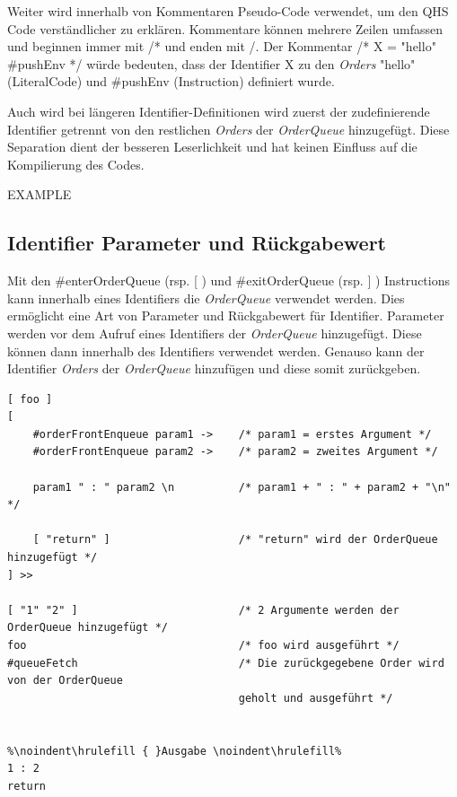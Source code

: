 Weiter wird innerhalb von Kommentaren Pseudo-Code verwendet, um den QHS Code verständlicher zu erklären.
Kommentare können mehrere Zeilen umfassen und beginnen immer mit {\listingFont\selectfont /*} und enden mit {\listingFont\selectfont*/}.
Der Kommentar {\listingFont\selectfont /* X = "hello" \#pushEnv */} würde bedeuten,
dass der Identifier {\listingFont\selectfont X} zu den \textit{Orders} {\listingFont\selectfont "hello" (LiteralCode)} und {\listingFont\selectfont \#pushEnv (Instruction)} definiert wurde. 

Auch wird bei längeren Identifier-Definitionen wird zuerst der zudefinierende Identifier getrennt von den restlichen \textit{Orders} der \textit{OrderQueue} hinzugefügt.
Diese Separation dient der besseren Leserlichkeit und hat keinen Einfluss auf die Kompilierung des Codes.

EXAMPLE

\subsection{Identifier Parameter und Rückgabewert}
Mit den \#enterOrderQueue (rsp. [ ) und \#exitOrderQueue (rsp. ] ) Instructions kann innerhalb eines Identifiers die \textit{OrderQueue} verwendet werden. Dies ermöglicht eine Art von Parameter und Rückgabewert für Identifier.
Parameter werden vor dem Aufruf eines Identifiers der \textit{OrderQueue} hinzugefügt. Diese können dann innerhalb des Identifiers verwendet werden.
Genauso kann der Identifier \textit{Orders} der \textit{OrderQueue} hinzufügen und diese somit zurückgeben.

\begin{lstlisting}[language=QHS, caption=Verwendung von Parametern und Rückgabewert eines Identifiers]
[ foo ]
[
    #orderFrontEnqueue param1 ->    /* param1 = erstes Argument */
    #orderFrontEnqueue param2 ->    /* param2 = zweites Argument */

    param1 " : " param2 \n          /* param1 + " : " + param2 + "\n" */

    [ "return" ]                    /* "return" wird der OrderQueue hinzugefügt */
] >>

[ "1" "2" ]                         /* 2 Argumente werden der OrderQueue hinzugefügt */
foo                                 /* foo wird ausgeführt */
#queueFetch                         /* Die zurückgegebene Order wird von der OrderQueue
                                    geholt und ausgeführt */


%\noindent\hrulefill { }Ausgabe \noindent\hrulefill%
1 : 2
return
\end{lstlisting}


